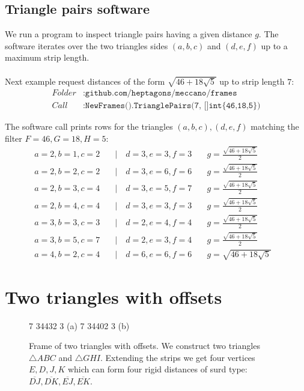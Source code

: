 \documentclass[11pt]{article}
\begin{document}
\subsection{Triangle pairs software}

We run a program to inspect triangle pairs having a given distance $g$. The software iterates
over the two triangles sides $(a,b,c)$ and $(d,e,f)$ up to a maximum strip length.
\\\\
Next example request distances of the form $\sqrt{46+18\sqrt{5}}$ up to strip length $7$:
\begin{align*}
Folder &: \texttt{github.com/heptagons/meccano/frames}\\
Call &: \texttt{NewFrames().TrianglePairs(7, []int\{46,18,5\})}
\end{align*}

The software call prints rows for the triangles $(a,b,c),(d,e,f)$ matching the filter $F=46,G=18,H=5$:
\begin{align*}
a=2, b=1, c=2 &\quad|\quad d=3, e=3, f=3 &\quad g=\frac{\sqrt{46+18\sqrt5}}2 &\\
a=2, b=2, c=2 &\quad|\quad d=3, e=6, f=6 &\quad g=\frac{\sqrt{46+18\sqrt5}}2 &\\
a=2, b=3, c=4 &\quad|\quad d=3, e=5, f=7 &\quad g=\frac{\sqrt{46+18\sqrt5}}2 &\\
a=2, b=4, c=4 &\quad|\quad d=3, e=3, f=3 &\quad g=\frac{\sqrt{46+18\sqrt5}}2 &\\
a=3, b=3, c=3 &\quad|\quad d=2, e=4, f=4 &\quad g=\frac{\sqrt{46+18\sqrt5}}2 &\\
a=3, b=5, c=7 &\quad|\quad d=2, e=3, f=4 &\quad g=\frac{\sqrt{46+18\sqrt5}}2 &\\
a=4, b=2, c=4 &\quad|\quad d=6, e=6, f=6 &\quad g=\sqrt{46+18\sqrt5}   &
\end{align*}

\section{Two triangles with offsets}

\begin{figure}[H]
\centering
\begin{center}
 {7} {3}{4}{4}{3}{2} {3} (a)
 {7} {3}{4}{4}{0}{2} {3} (b)
\end{center}
\caption{Frame of two triangles with offsets. We construct two triangles $\triangle{ABC}$ and
$\triangle{GHI}$. Extending the strips we get four vertices $E,D,J,K$ which
can form four rigid distances of surd type: $\overline{DJ}, \overline{DK},
\overline{EJ}, \overline{EK}$.}
\label{fig:5strips}
\end{figure}
\end{document}
